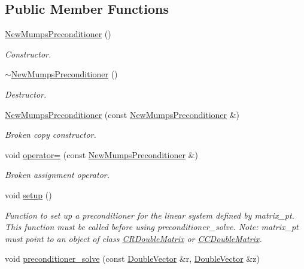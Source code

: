 \subsection*{Public Member Functions}
\begin{DoxyCompactItemize}
\item 
\hyperlink{classoomph_1_1NewMumpsPreconditioner_ab41fbf7f9b0996b26e2f49802156bca0}{New\+Mumps\+Preconditioner} ()
\begin{DoxyCompactList}\small\item\em Constructor. \end{DoxyCompactList}\item 
\hyperlink{classoomph_1_1NewMumpsPreconditioner_adf548286fc44a98ddecf0108c8b938e3}{$\sim$\+New\+Mumps\+Preconditioner} ()
\begin{DoxyCompactList}\small\item\em Destructor. \end{DoxyCompactList}\item 
\hyperlink{classoomph_1_1NewMumpsPreconditioner_a32bb5cf92d1f3976d81e63bdccfa9a86}{New\+Mumps\+Preconditioner} (const \hyperlink{classoomph_1_1NewMumpsPreconditioner}{New\+Mumps\+Preconditioner} \&)
\begin{DoxyCompactList}\small\item\em Broken copy constructor. \end{DoxyCompactList}\item 
void \hyperlink{classoomph_1_1NewMumpsPreconditioner_acc2b3a72965b6e18e584d0f9722bbd70}{operator=} (const \hyperlink{classoomph_1_1NewMumpsPreconditioner}{New\+Mumps\+Preconditioner} \&)
\begin{DoxyCompactList}\small\item\em Broken assignment operator. \end{DoxyCompactList}\item 
void \hyperlink{classoomph_1_1NewMumpsPreconditioner_a47e894b47284711131cb0a13a65c24e5}{setup} ()
\begin{DoxyCompactList}\small\item\em Function to set up a preconditioner for the linear system defined by matrix\+\_\+pt. This function must be called before using preconditioner\+\_\+solve. Note\+: matrix\+\_\+pt must point to an object of class \hyperlink{classoomph_1_1CRDoubleMatrix}{C\+R\+Double\+Matrix} or \hyperlink{classoomph_1_1CCDoubleMatrix}{C\+C\+Double\+Matrix}. \end{DoxyCompactList}\item 
void \hyperlink{classoomph_1_1NewMumpsPreconditioner_a763a8297c031fab7f16b37eaf257aeb1}{preconditioner\+\_\+solve} (const \hyperlink{classoomph_1_1DoubleVector}{Double\+Vector} \&r, \hyperlink{classoomph_1_1DoubleVector}{Double\+Vector} \&z)

\end{DoxyCompactItemize}
